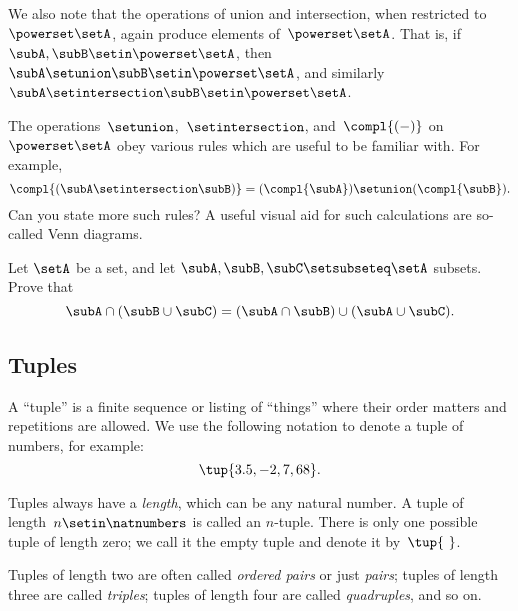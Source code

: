 We also note that the operations of union and intersection, when restricted to~$\powerset \setA$, again produce elements of~$\powerset \setA$.
That is, if~$\subA, \subB \setin\powerset \setA$, then~$\subA \setunion \subB \setin\powerset \setA$, and similarly~$\subA \setintersection \subB \setin\powerset \setA$.

The operations~$\setunion$,~$\setintersection$, and~$\compl{( - )}$ on~$\powerset \setA$ obey various rules which are useful to be familiar with.
For example,
\begin{equation*}
    \compl{(\subA \setintersection \subB)} = (\compl{\subA}) \setunion (\compl{\subB}).
\end{equation*}
Can you state more such rules?
A useful visual aid for such calculations are so-called Venn diagrams.


\begin{gradedexercise}
    \label{ex:distributing-subsets}
    Let $\setA$ be a set, and let $\subA, \subB, \subC \setsubseteq \setA$ subsets.
    Prove that
    \begin{equation}
        \subA \cap (\subB \cup \subC) = (\subA \cap \subB) \cup (\subA \cup \subC).
    \end{equation}
\end{gradedexercise}


\subsection{Tuples}
\label{sec:tuples}

A ``tuple'' is  a finite sequence or listing of ``things'' where their order matters and repetitions are allowed.
We use the following notation to denote a tuple of numbers, for example:
\begin{equation*}
    \tup{3.5, -2, 7, 68}.
\end{equation*}

Tuples always have a \emph{length}, which can be any natural number.
A tuple of length~$n \setin \natnumbers$ is called an $n$-tuple.
There is only one possible tuple of length zero; we call it the empty tuple and denote it by~$\tup{ \ }$.

Tuples of length two are often called \emph{ordered pairs} or just \emph{pairs};
tuples of length three are called \emph{triples};
tuples of length four are called \emph{quadruples}, and so on.

